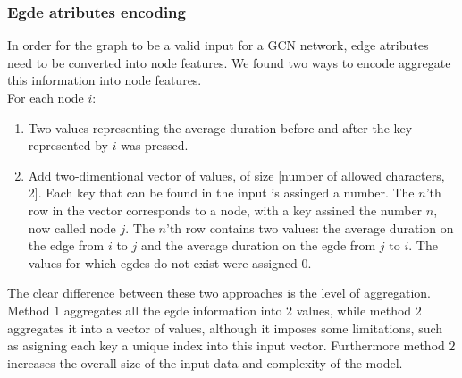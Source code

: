 \subsubsection{Egde atributes encoding}
In order for the graph to be a valid input for a GCN network, edge atributes need to be converted into node features. We found two ways to encode aggregate this information into node features.\\  
For each node $i$:
\begin{enumerate}
	\item Two values representing the average duration before and after the key represented by $i$ was pressed.
	\item Add two-dimentional vector of values, of size [number of allowed characters, 2]. Each key that can be found in the input is assinged a number. The $n$'th row in the vector corresponds to a node, with a key assined the number $n$, now called node $j$. The $n$'th row contains two values: the average duration on the edge from $i$ to $j$ and the average duration on the egde from $j$ to $i$. The values for which egdes do not exist were assigned 0.
\end{enumerate}
The clear difference between these two approaches is the level of aggregation. Method $1$ aggregates all the egde information into 2 values, while method $2$ aggregates it into a vector of values, although it imposes some limitations, such as asigning each key a unique index into this input vector. Furthermore method $2$ increases the overall size of the input data and complexity of the model.


